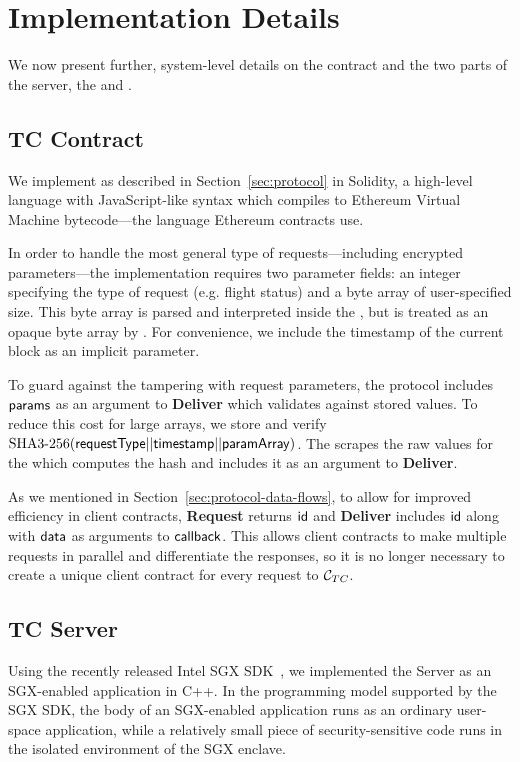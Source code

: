 
\section{\tc Implementation Details}
\label{sec:impl}

We now present further, system-level details on the \tc contract \tcont and the two parts of the \tc server, the \encname and \medname.

\subsection{TC Contract} 

We implement \tcont as described in Section~\ref{sec:protocol} in Solidity,
a high-level language with JavaScript-like syntax which compiles to Ethereum Virtual Machine bytecode---the language Ethereum contracts use.

In order to handle the most general type of requests---including encrypted parameters---the \tcont implementation requires two parameter fields:
an integer specifying the type of request (e.g. flight status) and a byte array of user-specified size.
This byte array is parsed and interpreted inside the \encname, but is treated as an opaque byte array by \tcont.
For convenience, we include the timestamp of the current block as an implicit parameter.

To guard against the \medname tampering with request parameters, the \tcont protocol includes ${\sf params}$ as an argument to {\bf Deliver} which validates against stored values.
To reduce this cost for large arrays, we store and verify \linebreak $\text{SHA3-256}({\sf requestType} || {\sf timestamp} || {\sf paramArray})$.
The \medname scrapes the raw values for the \encname which computes the hash and includes it as an argument to {\bf Deliver}.

As we mentioned in Section~\ref{sec:protocol-data-flows}, to allow for improved efficiency in client contracts,
{\bf Request} returns ${\sf id}$ and {\bf Deliver} includes ${\sf id}$ along with ${\sf data}$ as arguments to ${\sf callback}$.
This allows client contracts to make multiple requests in parallel and differentiate the responses,
so it is no longer necessary to create a unique client contract for every request to $\tcont$.



\subsection{TC Server}
Using the recently released Intel SGX SDK~\cite{sgxsdk}, we implemented the \tc
Server as an SGX-enabled application in C++. In the programming model supported
by the SGX SDK, the body of an SGX-enabled application runs as an ordinary
user-space application, while a relatively small piece of security-sensitive
code runs in the isolated environment of the SGX enclave.


